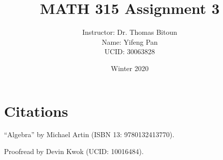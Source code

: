 \documentclass[10pt, letterpaper, titlepage]{article}
\title{MATH 315 Assignment 3}
\author{Instructor: Dr. Thomas Bitoun
    \\Name: Yifeng Pan
    \\UCID: 30063828}
\date{Winter 2020}
\begin{document}
    \maketitle

    
    \newpage
    
    \newpage
    
    \newpage
    

    \section*{Citations}
        ``Algebra'' by Michael Artin
        (ISBN 13: 9780132413770).

        Proofread by Devin Kwok
        (UCID: 10016484).
        
\end{document}
